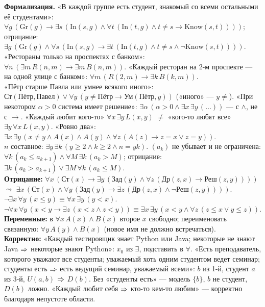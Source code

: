 {
\textbf{Формализация.} «В каждой группе есть студент, знакомый со всеми остальными её студентами»: $\forall g\,(\mathrm{Gr}(g)\to\exists s\,(\mathrm{In}(s,g)\wedge\forall t\,(\mathrm{In}(t,g)\wedge t\ne s\to\mathrm{Know}(s,t))))$; отрицание: $\exists g\,(\mathrm{Gr}(g)\wedge\forall s\,(\mathrm{In}(s,g)\to\exists t\,(\mathrm{In}(t,g)\wedge t\ne s\wedge\neg\mathrm{Know}(s,t))))$.\\
«Рестораны только на проспектах с банком»: $\forall n\,(\exists m\,R(n,m)\to\exists m\,B(n,m))$. «Каждый ресторан на 2-м проспекте — на одной улице с банком»: $\forall m\,(R(2,m)\to\exists k\,B(k,m))$.\\
«Пётр старше Павла или умнее всякого иного»: $\text{Ст}(\text{Пётр},\text{Павел})\vee\forall y\,(y\ne\text{Пётр}\to\text{Ум}(\text{Пётр},y))$ (\trap «иного» — $y\ne$). «При некотором $\alpha>0$ система имеет решение»: $\exists\alpha\,(\alpha>0\wedge\exists x\,\exists y\,(\dots))$ — с $\wedge$, не с $\to$. «Каждый любит кого-то» $\forall x\,\exists y\,L(x,y)$ $\ne$ «кого-то любят все» $\exists y\,\forall x\,L(x,y)$. «Ровно два»: $\exists x\,\exists y\,(x\ne y\wedge A(x)\wedge A(y)\wedge\forall z\,(A(z)\to z=x\vee z=y))$.\\
$n$ составное: $\exists y\,\exists k\,(y\ge2\wedge k\ge2\wedge n=yk)$. $(a_k)$ не убывает и не ограничена: $\forall k\,(a_k\le a_{k+1})\wedge\forall M\,\exists k\,(a_k>M)$; отрицание: $\exists k\,(a_k>a_{k+1})\vee\exists M\,\forall k\,(a_k\le M)$.\\
\textbf{Отрицание:} $\forall x\,(\text{Ст}(x)\to\exists y\,(\text{Зад}(y)\wedge\forall z\,(\text{Др}(z,x)\to\text{Реш}(z,y))))$ $\leadsto$ $\exists x\,(\text{Ст}(x)\wedge\forall y\,(\text{Зад}(y)\to\exists z\,(\text{Др}(z,x)\wedge\neg\text{Реш}(z,y))))$. $\neg\exists x\,\forall y\,(x\le y)\equiv\forall x\,\exists y\,(y<x)$. $\neg\forall x\,\forall y\,(x<y\to\exists z\,(x<z\wedge z<y))\equiv\exists x\,\exists y\,(x<y\wedge\forall z\,(z\le x\vee y\le z))$.\\
\textbf{Переменные:} в $\forall x\,A(x)\wedge B(x)$ второе $x$ свободно; переименовать связанную: $\forall y\,A(y)\wedge B(x)$ (новое имя не должно встречаться).\\
\textbf{Корректно:} «Каждый тестировщик знает Python или Java; некоторые не знают Java $\Rightarrow$ некоторые знают Python»: $x_0$ из $\exists$, подставить в $\forall$. «Есть преподаватель, которого уважают все студенты; уважаемый хоть одним студентом ведет семинар; студенты есть $\Rightarrow$ есть ведущий семинар, уважаемый всеми»: $b$ из 1-й, студент $a$ из 3-й, $U(a,b)$ $\Rightarrow$ $D(b)$. Без «студенты есть» — модель $\{b\}$, $b$ не студент, $D(b)$ ложно. «Каждый любит себя $\Rightarrow$ кто-то кем-то любим» — корректно благодаря непустоте области.\\
}
